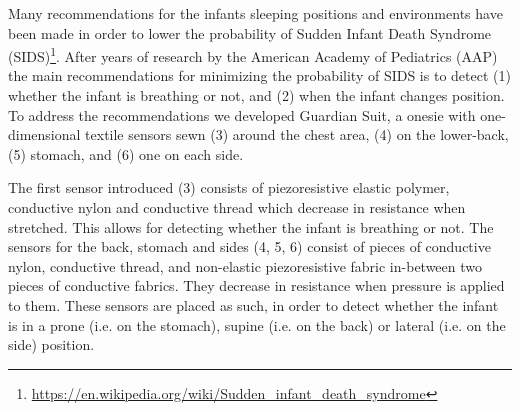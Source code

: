\documentclass{sigchi-ext}
\begin{document}
Many recommendations for the infants sleeping positions and environments have been made in order to lower the probability of Sudden Infant Death Syndrome (SIDS)\footnote{\url{https://en.wikipedia.org/wiki/Sudden_infant_death_syndrome}}.
After years of research by the American Academy of Pediatrics (AAP) \cite{aap-1992,aap-1996,aap-2005} the main recommendations for minimizing the probability of SIDS is to detect (1) whether the infant is breathing or not, and (2) when the infant changes position. To address the recommendations we developed Guardian Suit, a onesie with one-dimensional textile sensors sewn (3) around the chest area, (4) on the lower-back, (5) stomach, and (6) one on each side.

The first sensor introduced (3) consists of piezoresistive elastic polymer, conductive
nylon and conductive thread which decrease in resistance when stretched. This allows for detecting whether
the infant is breathing or not. The sensors for the back, stomach and sides (4, 5, 6) consist of pieces of conductive nylon, conductive thread, and non-elastic piezoresistive fabric in-between two pieces of conductive fabrics. They decrease in resistance when pressure is applied to them. 
These sensors are placed as such, in order to detect whether the infant is in a
prone (i.e. on the stomach), supine (i.e. on the back) or lateral (i.e. on the
side) position.

\end{document}
